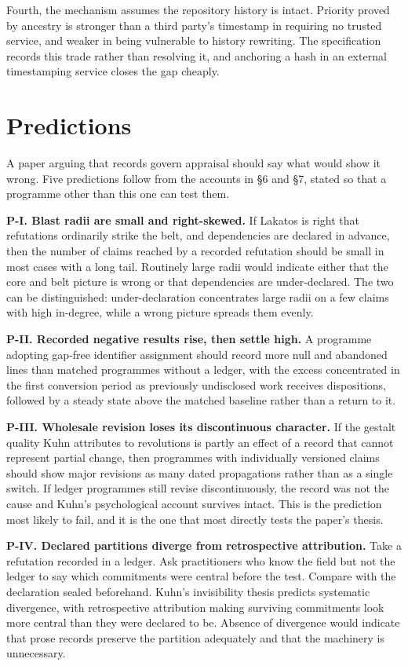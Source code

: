 \documentclass[11pt,letterpaper]{article}
\begin{document}
Fourth, the mechanism assumes the repository history is intact. Priority proved
by ancestry is stronger than a third party's timestamp in requiring no trusted
service, and weaker in being vulnerable to history rewriting. The specification
records this trade rather than resolving it, and anchoring a hash in an external
timestamping service closes the gap cheaply.

\section{Predictions}

A paper arguing that records govern appraisal should say what would show it
wrong. Five predictions follow from the accounts in \S6 and \S7, stated so that a
programme other than this one can test them.

\textbf{P-I. Blast radii are small and right-skewed.} If Lakatos is right that
refutations ordinarily strike the belt, and dependencies are declared in advance,
then the number of claims reached by a recorded refutation should be small in
most cases with a long tail. Routinely large radii would indicate either that
the core and belt picture is wrong or that dependencies are under-declared. The
two can be distinguished: under-declaration concentrates large radii on a few
claims with high in-degree, while a wrong picture spreads them evenly.

\textbf{P-II. Recorded negative results rise, then settle high.} A programme
adopting gap-free identifier assignment should record more null and abandoned
lines than matched programmes without a ledger, with the excess concentrated in
the first conversion period as previously undisclosed work receives
dispositions, followed by a steady state above the matched baseline rather than a
return to it.

\textbf{P-III. Wholesale revision loses its discontinuous character.} If the
gestalt quality Kuhn attributes to revolutions is partly an effect of a record
that cannot represent partial change, then programmes with individually
versioned claims should show major revisions as many dated propagations rather
than as a single switch. If ledger programmes still revise discontinuously, the
record was not the cause and Kuhn's psychological account survives intact. This
is the prediction most likely to fail, and it is the one that most directly tests
the paper's thesis.

\textbf{P-IV. Declared partitions diverge from retrospective attribution.} Take
a refutation recorded in a ledger. Ask practitioners who know the field but not
the ledger to say which commitments were central before the test. Compare with
the declaration sealed beforehand. Kuhn's invisibility thesis predicts systematic
divergence, with retrospective attribution making surviving commitments look more
central than they were declared to be. Absence of divergence would indicate that
prose records preserve the partition adequately and that the machinery is
unnecessary.
\end{document}
